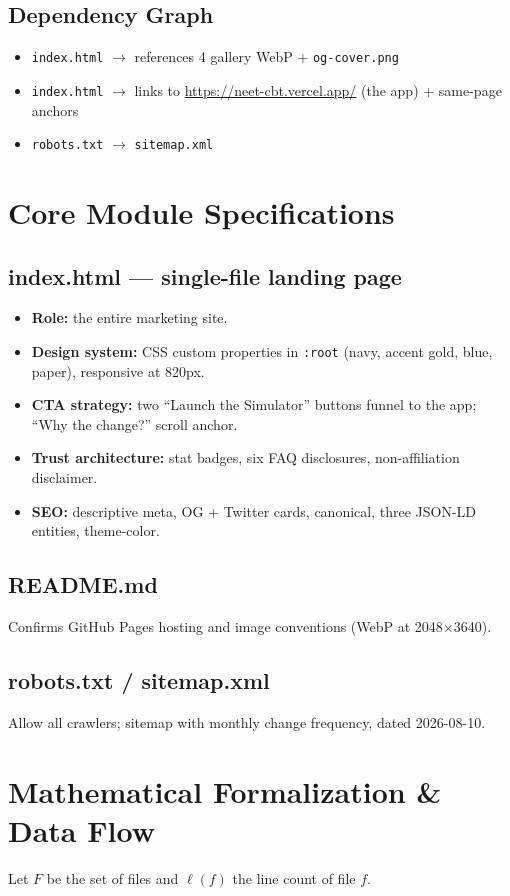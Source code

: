 \documentclass[11pt]{article}
\begin{document}
\subsection{Dependency Graph}
\begin{itemize}
  \item \texttt{index.html} $\rightarrow$ references 4 gallery WebP + \texttt{og-cover.png}
  \item \texttt{index.html} $\rightarrow$ links to \url{https://neet-cbt.vercel.app/} (the app) + same-page anchors
  \item \texttt{robots.txt} $\rightarrow$ \texttt{sitemap.xml}
\end{itemize}

\section{Core Module Specifications}
\subsection{index.html --- single-file landing page}
\begin{itemize}
  \item \textbf{Role:} the entire marketing site.
  \item \textbf{Design system:} CSS custom properties in \texttt{:root} (navy, accent gold, blue, paper), responsive at 820px.
  \item \textbf{CTA strategy:} two ``Launch the Simulator'' buttons funnel to the app; ``Why the change?'' scroll anchor.
  \item \textbf{Trust architecture:} stat badges, six FAQ disclosures, non-affiliation disclaimer.
  \item \textbf{SEO:} descriptive meta, OG + Twitter cards, canonical, three JSON-LD entities, theme-color.
\end{itemize}
\subsection{README.md}
Confirms GitHub Pages hosting and image conventions (WebP at 2048$\times$3640).
\subsection{robots.txt / sitemap.xml}
Allow all crawlers; sitemap with monthly change frequency, dated 2026-08-10.

\section{Mathematical Formalization \& Data Flow}
Let $F$ be the set of files and $\ell(f)$ the line count of file $f$.
\end{document}
